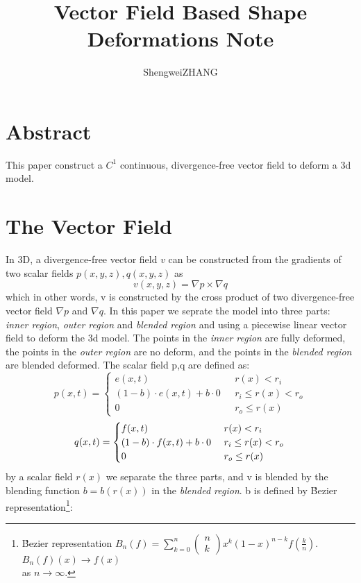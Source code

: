 \documentclass{article}
\title{Vector Field Based Shape Deformations Note}
\author{ShengweiZHANG\\
}
\theoremstyle{definition}
\theoremstyle{remark}
\begin{document}
\maketitle


\section{Abstract}
This paper construct a $C^1$ continuous, divergence-free vector field to deform a 3d model.
\section{The Vector Field}
In 3D, a divergence-free vector field $v$ can be constructed from the gradients of two scalar fields $p(x,y,z), q(x,y,z)$ as
\begin{equation}
  v(x,y,z) = \nabla p \times \nabla q
\end{equation}
which in other words, v is constructed by the cross product of two divergence-free vector field $\nabla p$ and $\nabla q$.
In this paper we seprate the model into three parts: \textit{inner region}, \textit{outer region} and \textit{blended region} and using a piecewise linear vector field to deform the 3d model.
The points in the \textit{inner region} are fully deformed, the points in the \textit{outer region} are no deform, and the points in the \textit{blended region} are blended deformed.
The scalar field p,q are defined as:
\begin{equation}
  p(x,t)=\begin{cases} e(x,t) & \mbox{ } r(x)<r_i\\
  (1-b)\cdot e(x,t) + b \cdot 0 &\mbox{ } r_i \le r(x) < r_o\\
  0 &  \mbox{ } r_o \le r(x) \end{cases}
\end{equation}
\begin{equation}
  q(x,t)=\begin{cases} f(x,t) & \mbox{ } r(x)<r_i\\
  (1-b)\cdot f(x,t) + b \cdot 0 &\mbox{ } r_i \le r(x) < r_o\\
  0 &  \mbox{ } r_o \le r(x) \end{cases}\\
\end{equation}
by a scalar field $r(x)$ we separate the three parts, and v is blended by the blending function $b=b(r(x))$ in the \textit{blended region}. b is defined by B́ezier representation\footnote{\noindent B́ezier representation $B_n(f)=\sum\limits_{k=0}^n \left(\begin{array}{c} n\\k \end{array}\right)x^k(1-x)^{n-k} f(\frac{k}{n})$. $B_n(f)(x) \rightarrow f(x)$ \\as $n\rightarrow \infty$.}:
\end{document}
